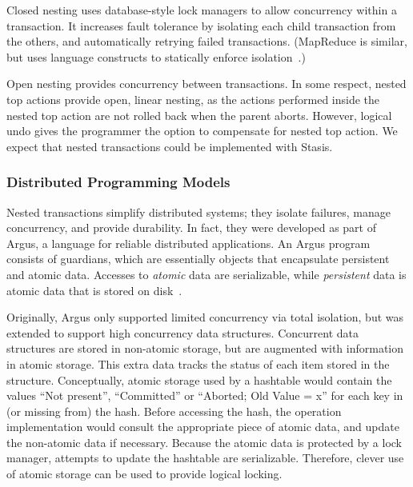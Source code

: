 \documentclass[letterpaper,twocolumn,10pt]{article}
\newcommand{\yad}{Stasis\xspace}
\begin{document}
Closed nesting uses database-style lock managers to allow concurrency
within a transaction.  It increases fault tolerance by isolating each
child transaction from the others, and automatically retrying failed
transactions.  (MapReduce is similar, but uses language constructs to
statically enforce isolation~\cite{mapReduce}.)

Open nesting provides concurrency between transactions.  In
some respect, nested top actions provide open, linear nesting, as the
actions performed inside the nested top action are not rolled back
when the parent aborts.  However, logical undo gives the programmer
the option to compensate for nested top action. We expect that nested
transactions could be implemented with \yad.

\subsubsection{Distributed Programming Models}
\label{sec:argus}

Nested transactions simplify distributed systems; they isolate
failures, manage concurrency, and provide durability.  In fact, they
were developed as part of Argus, a language for reliable distributed
applications.  An Argus program consists of guardians, which are essentially
objects that encapsulate persistent and atomic data.  Accesses to {\em
atomic} data are serializable, while {\em persistent} data is atomic
data that is stored on disk~\cite{argus}.

Originally, Argus only supported limited concurrency via total
isolation, but was extended to support high concurrency data
structures.  Concurrent data structures are stored in non-atomic storage, but are augmented with
information in atomic storage.  This extra data tracks the
status of each item stored in the structure.  Conceptually, atomic 
storage used by a hashtable would contain the values ``Not present'',
``Committed'' or ``Aborted; Old Value = x'' for each key in (or
missing from) the hash.  Before accessing the hash, the operation
implementation would consult the appropriate piece of atomic data, and
update the non-atomic data if necessary.  Because the atomic data is
protected by a lock manager, attempts to update the hashtable are serializable.
Therefore, clever use of atomic storage can be used to provide logical locking.
\end{document}
